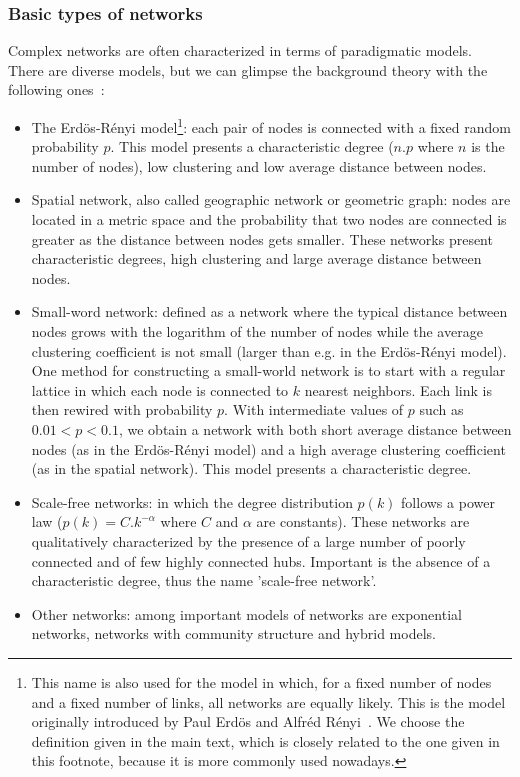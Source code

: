 \subsubsection{Basic types of networks}
Complex networks are often characterized in terms of paradigmatic models.
There are diverse models, but we can glimpse the background theory
with the following ones~\cite{luMeasures}:
\begin{itemize}
\item The Erdös-Rényi model\footnote{This name is also used for the model in which, for a fixed number of nodes and a fixed number of links, all networks are equally likely. This is the model originally introduced by Paul Erdös and Alfréd Rényi~\cite{erdosOrig}.
We choose the definition given in the main text, which is closely related to the one given in this footnote, because it is more commonly used nowadays.}: each pair of nodes is connected with a fixed random probability $p$.
This model presents a characteristic degree ($n.p$ where $n$ is the number of nodes), low clustering and low average distance between nodes.
\item Spatial network, also called geographic network or geometric graph: nodes are located in a metric space and the probability that two nodes are connected is greater as the distance between nodes gets smaller. These networks present characteristic degrees, high clustering and large average distance between nodes.
\item Small-word network: defined as a network where the typical distance between nodes grows with the logarithm of the number of nodes while the average clustering coefficient is not small (larger than e.g. in the Erdös-Rényi model).
One method for constructing a small-world network is to start with a regular lattice in which each node is connected to $k$ nearest neighbors.
Each link is then rewired with probability $p$.
With intermediate values of $p$ such as $0.01<p<0.1$, we obtain a network with both short average distance between nodes (as in the Erdös-Rényi model) and a high average clustering coefficient (as in the spatial network).
This model presents a characteristic degree.
\item Scale-free networks: in which the degree distribution $p(k)$ follows a power law ($p(k)=C.k^{-\alpha}$ where $C$ and $\alpha$ are constants).
These networks are qualitatively characterized by the presence of a large number of poorly connected and of few highly connected hubs.
Important is the absence of a characteristic degree, thus the name 'scale-free network'.
\item Other networks: among important models of networks are exponential networks, networks with community structure and hybrid models.
\end{itemize}
